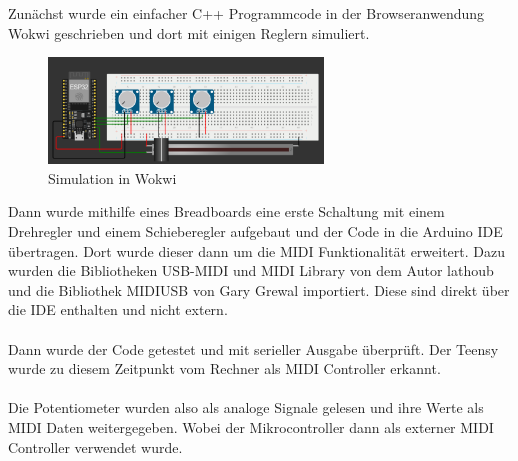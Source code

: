 \documentclass[12pt]{scrartcl}%
\theoremstyle{nonumberplain}
\begin{document}
Zunächst wurde ein einfacher C++ Programmcode in der Browseranwendung Wokwi geschrieben und dort mit einigen Reglern simuliert.\\

\begin{figure}
  \centering
  \includegraphics[width=0.65\textwidth]{wokwi}
  \caption{Simulation in Wokwi}
\end{figure}

\noindent Dann wurde mithilfe eines Breadboards eine erste Schaltung mit einem Drehregler und einem Schieberegler aufgebaut und der Code in die Arduino IDE übertragen.
\noindent Dort wurde dieser dann um die MIDI Funktionalität erweitert. Dazu wurden die Bibliotheken USB-MIDI und MIDI Library von dem Autor lathoub und die Bibliothek MIDIUSB von Gary Grewal importiert. Diese sind direkt über die IDE enthalten und nicht extern.
\\\\
Dann wurde der Code getestet und mit serieller Ausgabe überprüft. Der Teensy wurde zu diesem Zeitpunkt vom Rechner als MIDI Controller erkannt.
\\\\
Die Potentiometer wurden also als analoge Signale gelesen und ihre Werte als MIDI Daten weitergegeben. Wobei der Mikrocontroller dann als externer MIDI Controller verwendet wurde.
\end{document}
